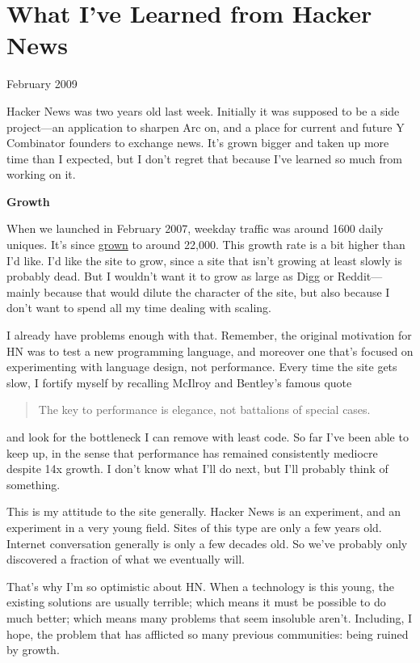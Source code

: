 \chapter{What I've Learned from Hacker News}

February 2009

Hacker News was two years old last week. Initially it was supposed to be
a side project---an application to sharpen Arc on, and a place for
current and future Y Combinator founders to exchange news. It's grown
bigger and taken up more time than I expected, but I don't regret that
because I've learned so much from working on it.

\textbf{Growth}

When we launched in February 2007, weekday traffic was around 1600 daily
uniques. It's since
\href{http://ycombinator.com/images/2yeartraffic.png}{grown} to around
22,000. This growth rate is a bit higher than I'd like. I'd like the
site to grow, since a site that isn't growing at least slowly is
probably dead. But I wouldn't want it to grow as large as Digg or
Reddit---mainly because that would dilute the character of the site, but
also because I don't want to spend all my time dealing with scaling.

I already have problems enough with that. Remember, the original
motivation for HN was to test a new programming language, and moreover
one that's focused on experimenting with language design, not
performance. Every time the site gets slow, I fortify myself by
recalling McIlroy and Bentley's famous quote

\begin{quote}
The key to performance is elegance, not battalions of special cases.
\end{quote}

and look for the bottleneck I can remove with least code. So far I've
been able to keep up, in the sense that performance has remained
consistently mediocre despite 14x growth. I don't know what I'll do
next, but I'll probably think of something.

This is my attitude to the site generally. Hacker News is an experiment,
and an experiment in a very young field. Sites of this type are only a
few years old. Internet conversation generally is only a few decades
old. So we've probably only discovered a fraction of what we eventually
will.

That's why I'm so optimistic about HN. When a technology is this young,
the existing solutions are usually terrible; which means it must be
possible to do much better; which means many problems that seem
insoluble aren't. Including, I hope, the problem that has afflicted so
many previous communities: being ruined by growth.


